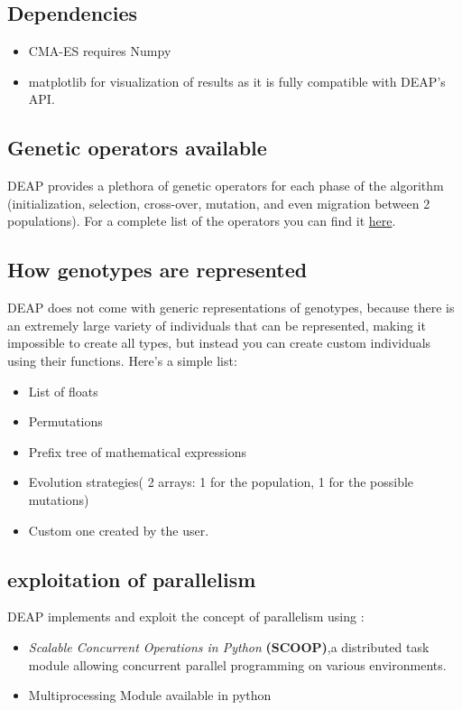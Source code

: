 \documentclass{article}
\begin{document}
\subsection{Dependencies}
\begin{itemize}
    \item CMA-ES requires Numpy
    \item matplotlib for visualization of results as it is fully compatible with DEAP's API.
\end{itemize}
\subsection{Genetic operators available}
DEAP provides a plethora of genetic operators for each phase of the algorithm (initialization, selection, cross-over, mutation, and even migration between 2 populations). For a complete list of the operators you can find it \href{https://deap.readthedocs.io/en/master/api/tools.html}{here}.
\subsection{How genotypes are represented}
DEAP does not come with generic representations of genotypes, because there is an extremely large variety of individuals that can be represented, making it impossible to create all types, but instead you can create custom individuals using their functions. Here's a simple list:
\begin{itemize}
    \item List of floats
    \item Permutations
    \item Prefix tree of mathematical expressions
    \item Evolution strategies( 2 arrays: 1 for the population, 1 for the possible mutations)
    \item Custom one created by the user.
\end{itemize}
\subsection{exploitation of parallelism}
    DEAP implements and exploit the concept of parallelism using :
    \begin{itemize}
        \item   \textit{Scalable Concurrent Operations in Python} \textbf{(SCOOP)},a distributed task module allowing concurrent parallel programming on various environments.
        \item Multiprocessing Module available in python
    \end{itemize}
\end{document}
